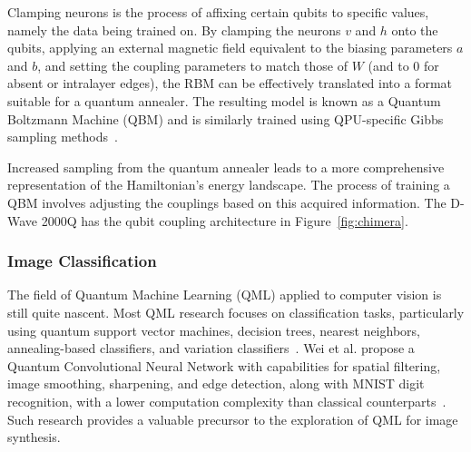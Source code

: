 \documentclass[technologies,article,accept,pdftex,moreauthors]{Definitions/mdpi}
\begin{document}
Clamping neurons is the process of affixing certain qubits to specific values, namely the data being trained on. By clamping the neurons $v$ and $h$ onto the qubits, applying an external magnetic field equivalent to the biasing parameters $a$ and $b$, and setting the coupling parameters to match those of $W$ (and to 0 for absent or intralayer edges), the RBM can be effectively translated into a format suitable for a quantum annealer. The resulting model is known as a Quantum Boltzmann Machine (QBM) and is similarly trained using QPU-specific Gibbs sampling methods~\cite{dwavedocs,qpugibbs}.



Increased sampling from the quantum annealer leads to a more comprehensive representation of the Hamiltonian's energy landscape. The process of training a QBM involves adjusting the couplings based on this acquired information. The D-Wave 2000Q has the qubit coupling architecture in Figure~\ref{fig:chimera}.

\subsubsection{Image Classification}
The field of Quantum Machine Learning (QML) applied to computer vision is still quite nascent. Most QML research focuses on classification tasks, particularly using quantum support vector machines, decision trees, nearest neighbors, annealing-based classifiers, and variation classifiers~\cite{classifiers}.  Wei et al. propose a Quantum Convolutional Neural Network with capabilities for spatial filtering, image smoothing, sharpening, and edge detection, along with MNIST digit recognition, with a lower computation complexity than classical counterparts~\cite{quantumCNN}. Such research provides a valuable precursor to the exploration of QML for image synthesis.
\end{document}

